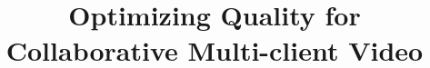 \documentclass{sig-alternate}
\begin{document}
%


\title{Optimizing Quality for Collaborative Multi-client Video}
%
%

%
\end{document}
